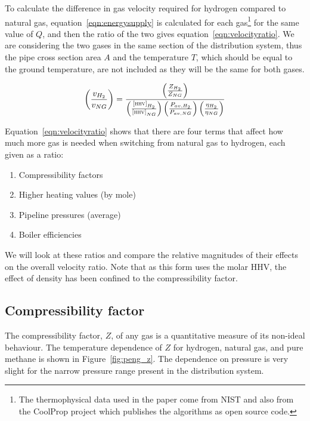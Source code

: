 \documentclass[5p]{elsarticle} %
\begin{document}
To calculate the difference in gas velocity required for hydrogen compared to natural gas,   equation~\eqref{eqn:energysupply} is calculated
for each gas\footnote{
The thermophysical data used in the paper come from NIST\citep{Huber2022} and also from the CoolProp project\citep{coolprop} which publishes the algorithms as open source code.}
for the same value of $Q$, and then the ratio of the two gives equation~\eqref{eqn:velocityratio}. 
We are considering the two gases in the same section of the distribution system, thus the pipe cross section area $A$ and the temperature $T$, which should be equal to the ground temperature, are not included as they will be the same for both gases.

\begin{equation}
\label{eqn:velocityratio}
    \left(\frac{v_{H_2}}{v_{NG}}\right) = 
    \frac{
        \left(\frac{Z_{H_2}}{Z_{NG}}\right) 
    }{
        \left(\frac{\textsc{[\textsc{hhv}]}_{H_2}}{\textsc{[\textsc{hhv}]}_{NG}}\right)  
        \left(\frac{P_{av,H_2}}{P_{av,NG}}\right)
        \left(\frac{\eta_{H_2}}{\eta_{NG}}\right)
    }
\end{equation}

Equation~\eqref{eqn:velocityratio} shows that there are four terms that affect how much more gas is needed when switching from natural gas to hydrogen, each given as a ratio: 
\begin{enumerate}
    \item Compressibility factors
    \item Higher heating values (by mole)
    \item Pipeline pressures (average)
    \item Boiler efficiencies
\end{enumerate}
We will look at 
these ratios and compare the relative magnitudes of their effects on the overall velocity ratio.
Note that as this form uses the molar HHV, the effect of density has been confined to the compressibility factor.

\subsection{Compressibility factor}
\label{sec:compressibility}

The compressibility factor, $Z$, of any gas is a quantitative measure of its non-ideal behaviour. 
The temperature dependence of $Z$ for hydrogen, natural gas, and pure methane is shown in Figure~\ref{fig:peng_z}.
The dependence on pressure is very slight for the narrow pressure range present in the distribution system\citep{GS(M)2023, dodds2013}.
\end{document}
